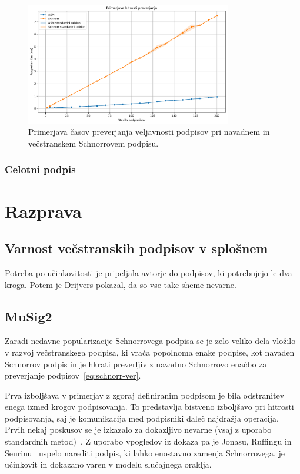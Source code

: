 \documentclass[isrm2, tisk]{fmfdelo}
\begin{document}
\begin{figure}[ht]
  \centering
  \includegraphics[width=0.8\textwidth]{images/benchmark_Verification.pdf}
  \caption[Preverjanje.]{Primerjava časov preverjanja veljavnosti podpisov pri navadnem in večstranskem
    Schnorrovem podpisu.}
  \label{fig:preverjanje}
\end{figure}


\subsubsection{Celotni podpis}

\section{Razprava}

\subsection{Varnost večstranskih podpisov v splošnem}
\label{sec:varnost}
Potreba po učinkovitosti je pripeljala avtorje do podpisov, ki potrebujejo le dva kroga. Potem je 
Drijvers pokazal, da so vse take sheme nevarne.

\subsection{MuSig2}
\label{sec:musig2}
Zaradi nedavne popularizacije Schnorrovega podpisa se je zelo veliko dela vložilo v razvoj večstranskega
podpisa, ki vrača popolnoma enake podpise, kot navaden Schnorrov podpis in je hkrati preverljiv
z navadno Schnorrovo enačbo za preverjanje podpisov~\eqref{eq:schnorr-ver}. 

Prva izboljšava v primerjav z zgoraj definiranim podpisom je bila odstranitev enega izmed krogov
podpisovanja. To predstavlja bistveno izboljšavo pri hitrosti podpisovanja, saj je komunikacija
med podpisniki daleč najdražja operacija. Prvih nekaj poskusov se je izkazalo za dokazljivo nevarne
(vsaj z uporabo standardnih metod)~\cite{drijvers2019security}. Z uporabo vpogledov iz dokaza pa je 
Jonasu, Ruffingu in Seurinu~\cite{jonas2020musig2} uspelo narediti podpis, ki lahko enostavno zamenja
Schnorrovega, je ućinkovit in dokazano varen v modelu slučajnega oraklja.
\end{document}
